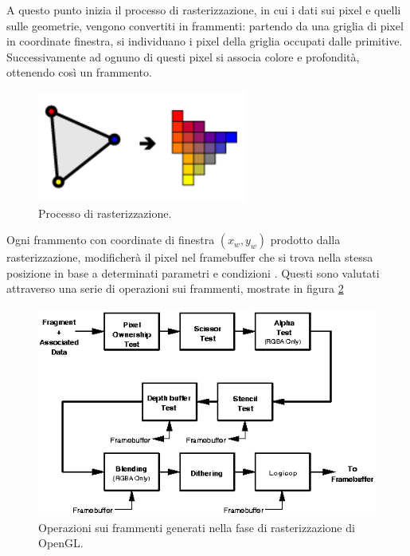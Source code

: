 A questo punto inizia il processo di rasterizzazione, in cui i dati sui pixel e quelli sulle geometrie, vengono convertiti in frammenti: partendo da una griglia di pixel in coordinate finestra, si individuano i pixel della griglia occupati dalle primitive. Successivamente ad ognuno di questi pixel si associa colore e profondità, ottenendo così un frammento. 
\\
\begin{figure}[htb]
 \centering
 \includegraphics[width=0.4\linewidth]{images/chapter_stato_arte/stato_arte_raster.png}\hfill
 \caption[Rasterizzazione OpenGL]{Processo di rasterizzazione.}
 \label{fig:stato_arte_raster}
\end{figure}

Ogni frammento con coordinate di finestra $(x_w,y_w)$ prodotto dalla rasterizzazione, modificherà il pixel nel framebuffer che si trova nella stessa posizione in base a determinati parametri e condizioni \cite{open12} . Questi sono valutati attraverso una serie di operazioni sui frammenti, mostrate in figura \ref{fig:stato_arte_frag_op}
\\
\begin{figure}[htb]
 \centering
 \includegraphics[width=0.9\linewidth]{images/chapter_stato_arte/stato_arte_frag_op.png}\hfill
 \caption[Operazioni sui frammenti]{Operazioni sui frammenti generati nella fase di rasterizzazione di OpenGL.}
 \label{fig:stato_arte_frag_op}
\end{figure}
\\

